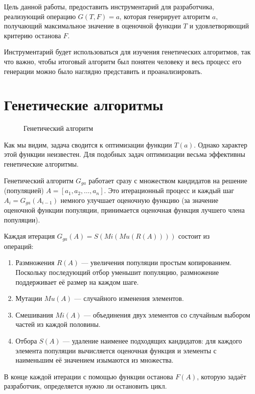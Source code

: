 \documentclass[utf8,a5paper,portrait,10pt,twoside]{eskdtext}
\begin{document}
Цель данной работы, предоставить инструментарий для разработчика, реализующий
операцию $G(T, F) = a$, которая генерирует алгоритм $a$, получающий максимальное
значение в оценочной функции $T$ и удовлетворяющий критерию останова $F$.

Инструментарий будет использоваться для изучения генетических алгоритмов, так
что важно, чтобы итоговый алгоритм был понятен человеку и весь процесс его
генерации можно было наглядно представить и проанализировать.

\newpage
\section{Генетические алгоритмы}

\begin{figure}
  \centering
  
  \caption{Генетический алгоритм}
\end{figure}

Как мы видим, задача сводится к оптимизации функции $T(a)$. Однако характер этой
функции неизвестен. Для подобных задач оптимизации весьма эффективны
генетические алгоритмы.\cite{reinforcement}

Генетический алгоритм $G_{ga}$ работает сразу с множеством кандидатов на решение
(популяцией) $A = [a_1, a_2, …, a_n]$. Это итерационный процесс и каждый шаг
$A_i = G_{ga}(A_{i-1})$ немного улучшает оценочную функцию (за значение
оценочной функции популяции, принимается оценочная функция лучшего члена
популяции).

Каждая итерация $G_{ga}(A) = S(Mi(Mu(R(A))))$ состоит из\\
операций:\cite{reinforcement}
\begin{enumerate}
  \item Размножения $R(A)$ — увеличения популяции простым копированием.
        Поскольку последующий отбор уменьшит популяцию, размножение поддерживает
        её размер на каждом шаге.
  \item Мутации $Mu(A)$ — случайного изменения элементов.
  \item Смешивания $Mi(A)$ — объединения двух элементов со случайным выбором
        частей из каждой половины.
  \item Отбора $S(A)$ — удаление наименее подходящих кандидатов: для каждого
        элемента популяции вычисляется оценочная функция и элементы с
        наименьшим её значением изымаются из множества.
\end{enumerate}

В конце каждой итерации с помощью функции останова $F(A)$, которую задаёт
разработчик, определяется нужно ли остановить цикл.
\end{document}
